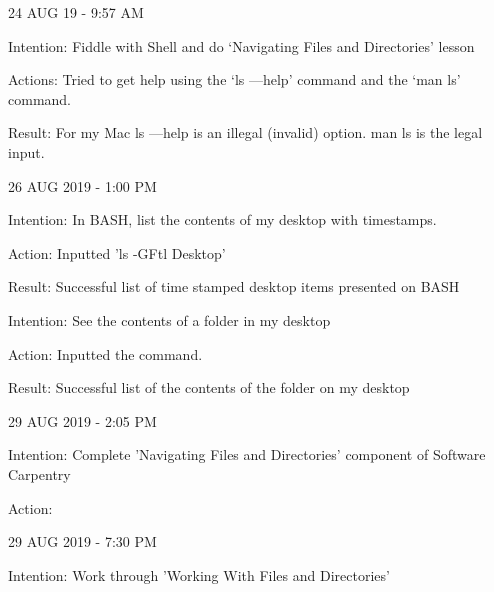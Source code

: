 24 AUG 19 - 9:57 AM

Intention: Fiddle with Shell and do ‘Navigating Files and Directories’ lesson

Actions: Tried to get help using the ‘ls —help’ command and the ‘man ls’ command.

Result: For my Mac ls —help is an illegal (invalid) option. man ls is the legal input.


26 AUG 2019 - 1:00 PM

Intention: In BASH, list the contents of my desktop with timestamps.

Action: Inputted 'ls -GFtl Desktop'

Result: Successful list of time stamped desktop items presented on BASH

Intention: See the contents of a folder in my desktop

Action: Inputted the command.

Result: Successful list of the contents of the folder on my desktop

29 AUG 2019 - 2:05 PM

Intention: Complete 'Navigating Files and Directories' component of Software Carpentry

Action: 


29 AUG 2019 - 7:30 PM

Intention: Work through 'Working With Files and Directories'


